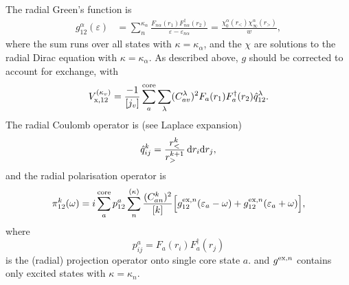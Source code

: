 \documentclass[10pt,twocolumn,a4paper]{article}%
\newcommand{\be}{\begin{equation}}
\newcommand{\ee}{\end{equation}}
\def\d{\ensuremath{{\rm d}}}
\def\en{\ensuremath{\varepsilon}}
\renewcommand{\a}{\ensuremath{\alpha}}
\renewcommand{\b}{\ensuremath{\beta}}
\renewcommand{\k}{\ensuremath{\kappa}}
\newcommand{\w}{\ensuremath{\omega}}
\newcommand{\note}[1]{{\color{orange}{${}^*$({#1})}}}
\begin{document}
The radial Green's function is
\begin{align}\label{eq:RadialGreen}
g^\a_{12}(\en) &= \sum_n^{\k_\a} \frac{F_{n\a}(r_1)F^\dag_{n\a}(r_2)}{\en-\en_{n\a}}
= \frac{\chi_0^\a(r_<)\chi_\infty^\a(r_>)}{w},
\end{align}
where the sum runs over all states with $\k=\k_\a$, and the $\chi$ are solutions to the radial Dirac equation with $\k=\k_\a$.
As described above, $g$ should be corrected to account for exchange, with
\be\label{eq:RadialVx}
V_{\rm x,12}^{(\k_v)} = \frac{-1}{[j_v]}\sum_a^{\rm core}\sum_\lambda (C^\lambda_{av})^2F_a(r_1)F_a^\dag(r_2)\hat q^\lambda_{12}.
\ee
The radial Coulomb operator is (see Laplace expansion)
\be\label{eq:RadialQ}
\hat q^k_{ij} = \frac{r_<^k}{r_>^{k+1}} \, \d r_i\d r_j,
\ee
and the radial polarisation operator is
\begin{multline}\label{eq:RadialPolarisation}
\pi_{12}^{k}(\w) = i\sum_{a}^{\rm core}p^a_{12}\sum_{n}^{(\kappa)} \frac{(C^k_{an})^2}{[k]}
\Big[g_{12}^{{\rm ex},n}(\en_{a}-\w)
+g_{12}^{{\rm ex},n}(\en_{a}+\w)
\Big],
\end{multline}
where
\[
p^a_{ij} = F_a(r_i)F^\dag_a(r_j)
\]
is the (radial) projection operator onto single core state $a$.
and
$g^{{\rm ex},n}$ contains only excited states with $\k=\k_n$.


%
\end{document}
